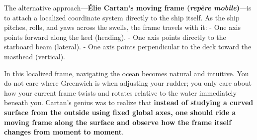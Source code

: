 \documentclass[11pt,twoside,openright]{amsbook}
\begin{document}
{{{{{{The alternative approach—\textbf{Élie Cartan’s moving frame (\textit{repère mobile})}—is to attach a localized coordinate system directly to the ship itself. As the ship pitches, rolls, and yaws across the swells, the frame travels with it:
- One axis points forward along the keel (heading).
- One axis points directly to the starboard beam (lateral).
- One axis points perpendicular to the deck toward the masthead (vertical).

In this localized frame, navigating the ocean becomes natural and intuitive. You do not care where Greenwich is when adjusting your rudder; you only care about how your current frame twists and rotates relative to the water immediately beneath you. Cartan’s genius was to realize that \textbf{instead of studying a curved surface from the outside using fixed global axes, one should ride a moving frame along the surface and observe how the frame itself changes from moment to moment}.

}}}}}}
\end{document}
